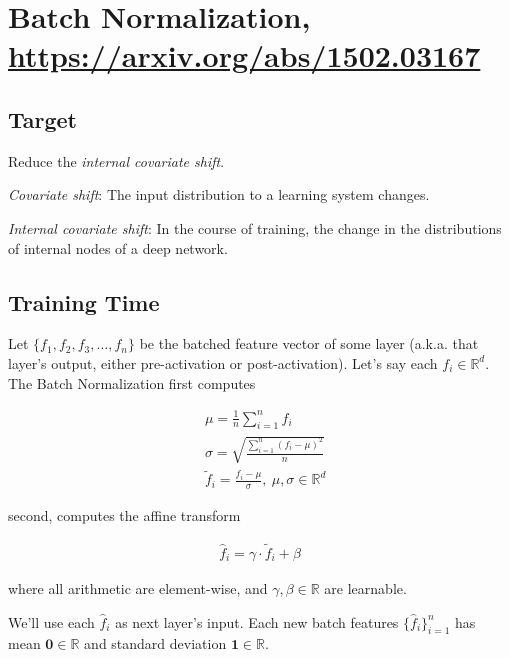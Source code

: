 \documentclass{article}
\begin{document}
    \section*{Batch Normalization, \href{https://arxiv.org/abs/1502.03167}{https://arxiv.org/abs/1502.03167}}

        \subsection*{Target}
            
            Reduce the \textit{internal covariate shift}.

            \textit{Covariate shift}: The input distribution to a learning
            system changes.

            \textit{Internal covariate shift}: In the course of
            training, the change in the distributions of internal nodes of a
            deep network.

        \subsection*{Training Time}

            Let $ \{ f_{1}, f_{2}, f_{3}, \dots, f_{n} \} $ be the batched
            feature vector of some layer (a.k.a. that layer's output, either
            pre-activation or post-activation). Let's say each $ f_{i} \in
            \mathbb{R}^d $. The Batch Normalization first computes

            \begin{align*}
                & \mu = \frac{1}{n} \sum_{i = 1}^n f_{i} \\
                & \sigma = \sqrt{\frac{\sum_{i = 1}^n ( f_{i} - \mu )^2}{n}} \\
                & \tilde{f}_{i} = \frac{ f_{i} - \mu }{\sigma},~\mu, \sigma \in \mathbb{R}^d
            \end{align*}

            second, computes the affine transform

            \begin{align*}
                 \hat{f}_{i} = \gamma \cdot \tilde{f}_{i} + \beta
            \end{align*}

            where all arithmetic are element-wise, and $ \gamma, \beta \in \mathbb{R} $ are learnable. 

            We'll use each $ \hat{f}_{i} $ as next layer's input. Each new
            batch features $ \{ \hat{f}_{i} \}_{i = 1}^n $ has mean $ \mathbf{0} \in \mathbb{R} $ and
            standard deviation $ \mathbf{1} \in \mathbb{R} $.
\end{document}
